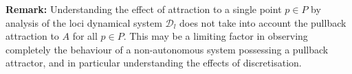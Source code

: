 {\bf Remark:} Understanding the effect of attraction to a single
point $p \in P$ by analysis of the loci dynamical system
$\mathcal{D}_l$ does not take into account the pullback attraction
to $A$ for all $p \in P$. This may be a limiting factor in
observing completely the behaviour of a non-autonomous system
possessing a pullback attractor, and in particular understanding
the effects of discretisation.

\endinput
